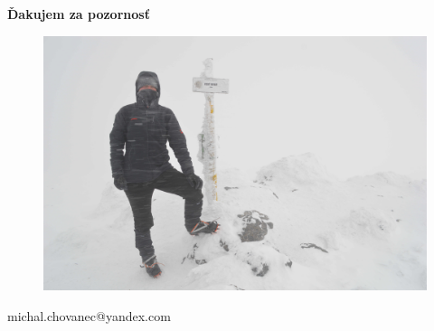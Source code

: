 \documentclass[xcolor=dvipsnames]{beamer}
\begin{document}
\begin{frame}{\bf Ďakujem za pozornosť}

\begin{figure}[ht]
\begin{center}
\begin{minipage}{0.8\linewidth}
\begin{center}
  \includegraphics[width=1.0\textwidth]{images/krivan.jpg}
\end{center}
\end{minipage}
\end{center}
\end{figure}


\centerline{michal.chovanec@yandex.com}

\end{frame}
\end{document}

